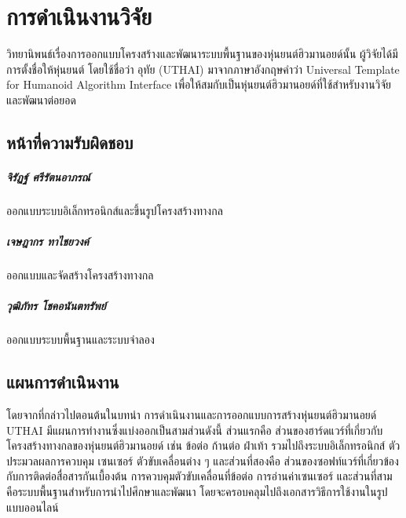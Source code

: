 \chapter{การดำเนินงานวิจัย}
วิทยานิพนธ์เรื่องการออกแบบโครงสร้างและพัฒนาระบบพื้นฐานของหุ่นยนต์ฮิวมานอยด์นั้น ผู้วิจัยได้มีการตั้งชื่อให้หุ่นยนต์
โดยใช้ชื่อว่า อุทัย (UTHAI) มาจากภาษาอังกฤษคำว่า Universal Template for Humanoid Algorithm Interface
เพื่อให้สมกับเป็นหุ่นยนต์ฮิวมานอยด์ที่ใช้สำหรับงานวิจัยและพัฒนาต่อยอด

\vspace{3mm}
\section{หน้าที่ความรับผิดชอบ}
\paragraph*{จิรัฏฐ์ ศรีรัตนอาภรณ์}
ออกแบบระบบอิเล็กทรอนิกส์และขึ้นรูปโครงสร้างทางกล
\paragraph*{เจษฎากร ทาไชยวงค์}
ออกแบบและจัดสร้างโครงสร้างทางกล
\paragraph*{วุฒิภัทร โชคอนันตทรัพย์}
ออกแบบระบบพื้นฐานและระบบจำลอง

\vspace{3mm}
\section{แผนการดำเนินงาน}
โดยจากที่กล่าวไปตอนต้นในบทนำ
การดำเนินงานและการออกแบบการสร้างหุ่นยนต์ฮิวมานอยด์ UTHAI มีแผนการทำงานซึ่งแบ่งออกเป็นสามส่วนดังนี้
ส่วนแรกคือ ส่วนของฮาร์ดแวร์ที่เกี่ยวกับโครงสร้างทางกลของหุ่นยนต์ฮิวมานอยด์ เช่น ข้อต่อ ก้านต่อ ฝ่าเท้า
รวมไปถึงระบบอิเล็กทรอนิกส์ ตัวประมวลผลการควบคุม เซนเซอร์ ตัวขับเคลื่อนต่าง ๆ และส่วนที่สองคือ
ส่วนของซอฟท์แวร์ที่เกี่ยวข้องกับการติดต่อสื่อสารกันเบื้องต้น การควบคุมตัวขับเคลื่อนที่ข้อต่อ การอ่านค่าเซนเซอร์
และส่วนที่สาม คือระบบพื้นฐานสำหรับการนำไปศึกษาและพัฒนา โดยจะครอบคลุมไปถึงเอกสารวิธีการใช้งานในรูปแบบออนไลน์

